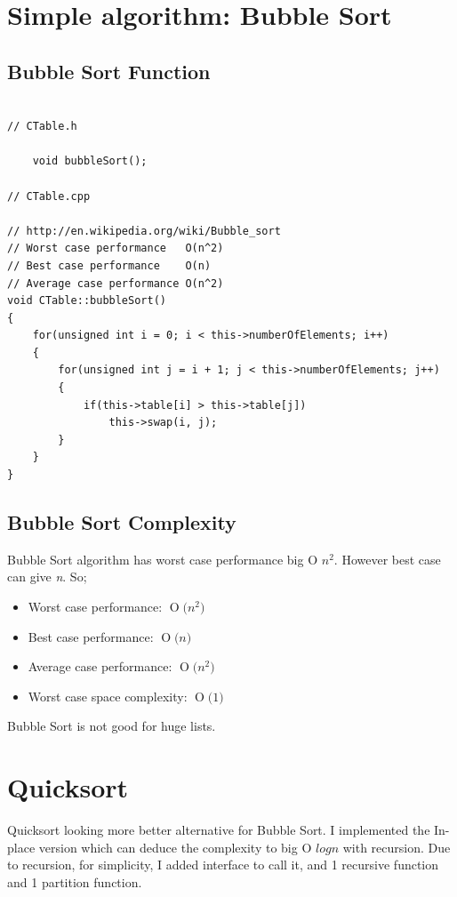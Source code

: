 \documentclass{article}
\newcommand{\BigO}[1]{\ensuremath{\operatorname{O}\bigl(#1\bigr)}}
\begin{document}
	

\section{Simple algorithm: Bubble Sort}

	\subsection{Bubble Sort Function}
	\begin{lstlisting}[label=CTable-bubleSort, caption=Bubble Sort]
	
// CTable.h
	
    void bubbleSort();
    
// CTable.cpp
    
// http://en.wikipedia.org/wiki/Bubble_sort
// Worst case performance   O(n^2)
// Best case performance    O(n)
// Average case performance O(n^2)
void CTable::bubbleSort()
{
    for(unsigned int i = 0; i < this->numberOfElements; i++)
    {
        for(unsigned int j = i + 1; j < this->numberOfElements; j++)
        {
            if(this->table[i] > this->table[j])
                this->swap(i, j);
        }
    }
}

	\end{lstlisting}
	
	\subsection{Bubble Sort Complexity}
	Bubble Sort algorithm has worst case performance big O \emph{$n^{2}$}. However best case can give \emph{n}. So;
	\begin{itemize}
	\item Worst case performance: \BigO{n^{2}}
	\item Best case performance: \BigO{n}
	\item Average case performance: \BigO{n^{2}}
	\item Worst case space complexity: \BigO{1}
	\end{itemize}
	Bubble Sort is not good for huge lists.
	
	
	
\section{Quicksort}
	Quicksort looking more better alternative for Bubble Sort. I implemented the In-place version which can deduce the complexity to big O \emph{$log n$} with recursion. Due to recursion, for simplicity, I added interface to call it, and 1 recursive function and 1 partition function.
\end{document}

